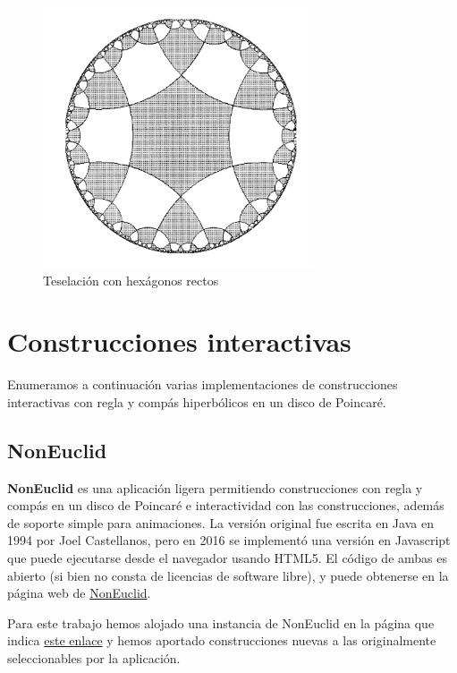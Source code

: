 \documentclass{article}
\theoremstyle{plain}
\theoremstyle{definition}
\theoremstyle{remark}
\begin{document}
\begin{figure}[ht!]
  \centering
  \includegraphics[width=80mm]{./teselahexagonos.png}
  \caption{Teselación con hexágonos rectos\label{teselahexagon}}
\end{figure}




\section{Construcciones interactivas}
Enumeramos a continuación varias implementaciones de construcciones interactivas
con regla y compás hiperbólicos en un disco de Poincaré.

\subsection{NonEuclid}
\textbf{NonEuclid} es una aplicación ligera permitiendo construcciones
con regla y compás en un disco de Poincaré e interactividad con las
construcciones, además de soporte simple para animaciones. La versión
original fue escrita en Java en 1994 por Joel Castellanos, pero en
2016 se implementó una versión en Javascript que puede ejecutarse
desde el navegador usando HTML5. El código de ambas es abierto (si
bien no consta de licencias de software libre), y puede obtenerse en
la página web de
\href{https://www.cs.unm.edu/~joel/NonEuclid/NonEuclid.html}{NonEuclid}.

Para este trabajo hemos alojado una instancia de NonEuclid en la
página que indica \href{https://m42.github.io/hiperboloide/}{este
  enlace} y hemos aportado construcciones nuevas a las originalmente
seleccionables por la aplicación.
\end{document}
